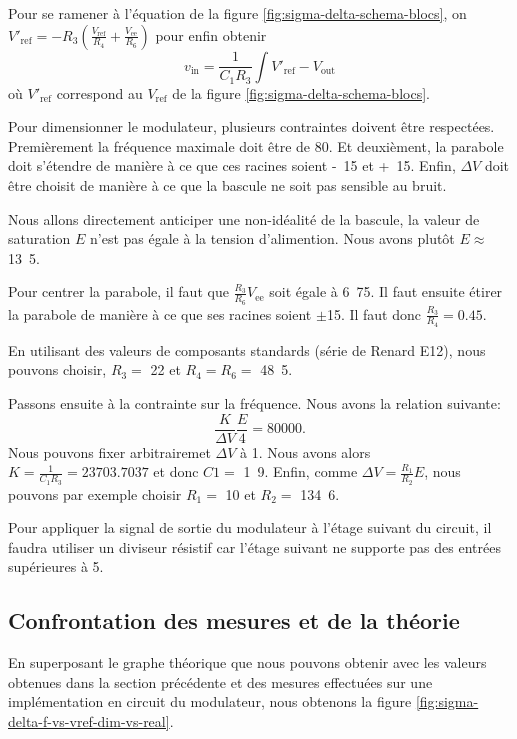 Pour se ramener à l'équation de la figure
\ref{fig:sigma-delta-schema-blocs}, on
$V'_{\text{ref}} = -R_3(\frac{V_{\text{ref}}}{R_4}+\frac{V_{\text{ee}}}{R_6})$
pour enfin obtenir
\[ v_{\text{in}} = \frac{1}{C_1R_3} \int V'_{\text{ref}} - V_{\text{out}}\]
où $V'_{\text{ref}}$ correspond au $V_{\text{ref}}$
de la figure \ref{fig:sigma-delta-schema-blocs}.

Pour dimensionner le modulateur, plusieurs contraintes doivent
être respectées. Premièrement la fréquence maximale doit être
de \unit{80}{\kilo\hertz}. Et deuxièment, la parabole doit s'étendre
de manière à ce que ces racines soient \unit{-15}{\volt} et
\unit{+15}{\volt}. Enfin, $\Delta V$ doit être choisit de manière
à ce que la bascule ne soit pas sensible au bruit.

Nous allons directement anticiper une non-idéalité de la bascule,
la valeur de saturation $E$ n'est pas égale à la tension
d'alimention. Nous avons plutôt $E \approx$ \unit{13.5}{\volt}.

Pour centrer la parabole, il faut que $\frac{R_3}{R_6}V_{\text{ee}}$
soit égale à \unit{6.75}{\volt}. Il faut ensuite étirer la
parabole de manière à ce que ses racines soient $\pm$\unit{15}{\volt}.
Il faut donc $\frac{R_3}{R_4} = 0.45$. 

En utilisant des valeurs de composants standards (série de Renard E12), 
nous pouvons choisir, $R_3 =$ \unit{22}{\kilo\ohm} et $R_4 = R_6 =
$ \unit{48.5}{\kilo\ohm}.

Passons ensuite à la contrainte sur la fréquence. Nous avons la 
relation suivante:
\[ \frac{K}{\Delta V}\frac{E}{4} = 80000.\]
Nous pouvons fixer arbitrairemet $\Delta V$ à \unit{1}{\volt}. Nous avons alors
$K = \frac{1}{C_1R_3} = 23703.7037$ et donc $C1 =$ \unit{1.9}{\nano\farad}.
Enfin, comme $\Delta V = \frac{R_1}{R_2}E$, nous pouvons par exemple
choisir $R_1 =$ \unit{10}{\kilo\ohm} et $R_2 =$ \unit{134.6}{\kilo\ohm}.


Pour appliquer la signal de sortie du modulateur
à l'étage suivant du circuit, il faudra utiliser un diviseur
résistif car l'étage suivant ne supporte pas des entrées supérieures
à \unit{5}{\volt}.

\subsection{Confrontation des mesures et de la théorie}
En superposant le graphe théorique que nous pouvons obtenir avec les valeurs
obtenues dans la section précédente
et des mesures effectuées sur une implémentation en circuit
du modulateur, nous obtenons la figure \ref{fig:sigma-delta-f-vs-vref-dim-vs-real}.


